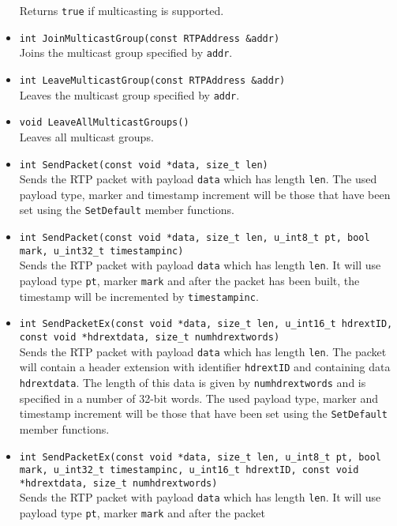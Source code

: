 \documentclass[12pt,a4paper]{article}
\begin{document}
\begin{itemize}
						Returns {\tt true} if multicasting is supported.
					\item {\tt int JoinMulticastGroup(const RTPAddress \&addr)}\\
						Joins the multicast group specified by {\tt addr}.
					\item {\tt int LeaveMulticastGroup(const RTPAddress \&addr)}\\
						Leaves the multicast group specified by {\tt addr}.
					\item {\tt void LeaveAllMulticastGroups()}\\
						Leaves all multicast groups.
					\item {\tt int SendPacket(const void *data, size\_t len)}\\
						Sends the RTP packet with payload {\tt data} which has length {\tt len}.
						The used payload type, marker and timestamp increment will be those that
						have been set using the {\tt SetDefault} member functions.
					\item {\tt int SendPacket(const void *data, size\_t len,
					                          u\_int8\_t pt, bool mark, u\_int32\_t timestampinc)}\\
						Sends the RTP packet with payload {\tt data} which has length {\tt len}.
						It will use payload type {\tt pt}, marker {\tt mark} and after the packet
						has been built, the timestamp will be incremented by {\tt timestampinc}.
					\item {\tt int SendPacketEx(const void *data, size\_t len,
					                            u\_int16\_t hdrextID, const void *hdrextdata, size\_t numhdrextwords)}\\
						Sends the RTP packet with payload {\tt data} which has length {\tt len}.
						The packet will contain a header extension with identifier {\tt hdrextID} and
						containing data {\tt hdrextdata}. The length of this data is given by
						{\tt numhdrextwords} and is specified in a number of 32-bit words.
						The used payload type, marker and timestamp increment will be those that
						have been set using the {\tt SetDefault} member functions.
					\item {\tt int SendPacketEx(const void *data, size\_t len,
					                            u\_int8\_t pt, bool mark, u\_int32\_t timestampinc,
					                            u\_int16\_t hdrextID, const void *hdrextdata, size\_t numhdrextwords)}\\
						Sends the RTP packet with payload {\tt data} which has length {\tt len}.
						It will use payload type {\tt pt}, marker {\tt mark} and after the packet

\end{itemize}
\end{document}
